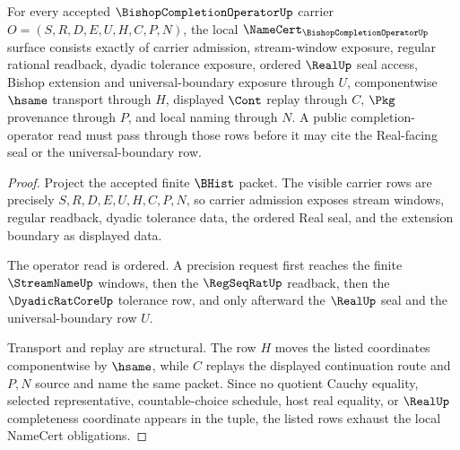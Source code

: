 \begin{theorem}
\label{thm:bishop-completion-operator-namecert-obligations}
For every accepted $\BishopCompletionOperatorUp$ carrier $O=(S,R,D,E,U,H,C,P,N)$, the local $\NameCert_{\BishopCompletionOperatorUp}$ surface consists exactly of carrier admission, stream-window exposure, regular rational readback, dyadic tolerance exposure, ordered $\RealUp$ seal access, Bishop extension and universal-boundary exposure through $U$, componentwise $\hsame$ transport through $H$, displayed $\Cont$ replay through $C$, $\Pkg$ provenance through $P$, and local naming through $N$. A public completion-operator read must pass through those rows before it may cite the Real-facing seal or the universal-boundary row.
\end{theorem}
\begin{proof}
Project the accepted finite $\BHist$ packet. The visible carrier rows are precisely $S,R,D,E,U,H,C,P,N$, so carrier admission exposes stream windows, regular readback, dyadic tolerance data, the ordered Real seal, and the extension boundary as displayed data.

The operator read is ordered. A precision request first reaches the finite $\StreamNameUp$ windows, then the $\RegSeqRatUp$ readback, then the $\DyadicRatCoreUp$ tolerance row, and only afterward the $\RealUp$ seal and the universal-boundary row $U$.

Transport and replay are structural. The row $H$ moves the listed coordinates componentwise by $\hsame$, while $C$ replays the displayed continuation route and $P,N$ source and name the same packet. Since no quotient Cauchy equality, selected representative, countable-choice schedule, host real equality, or $\RealUp$ completeness coordinate appears in the tuple, the listed rows exhaust the local NameCert obligations.
\end{proof}

